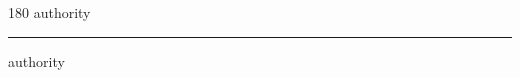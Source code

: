
\begin{frame}
\begin{center}
\begin{turn}{180}
{\fontsize{2.5cm}{1em}\selectfont authority}
\end{turn}
\vspace{1em}\par  
\hrule
\vspace{1em}\par  
{\fontsize{2.5cm}{1em}\selectfont authority}
\end{center}
\end{frame}
